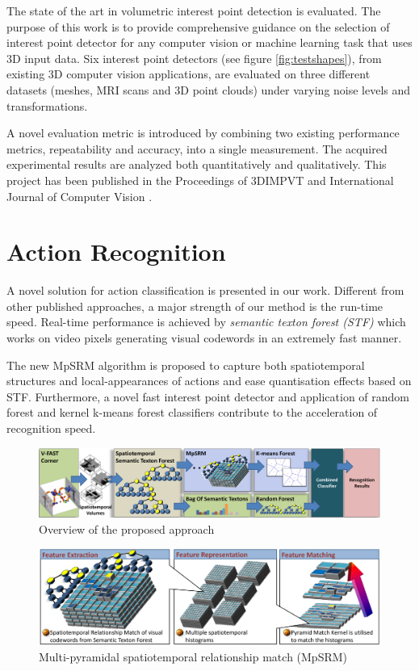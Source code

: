 \documentclass[10pt, a4paper]{article}
\begin{document}
The state of the art in volumetric interest point detection is evaluated. The purpose of this work is to provide comprehensive guidance on the selection of interest point detector for any computer vision or machine learning task that uses 3D input data. Six interest point detectors (see figure \ref{fig:testshapes}), from existing 3D computer vision applications, are evaluated on three different datasets (meshes, MRI scans and 3D point clouds) under varying noise levels and transformations. 

A novel evaluation metric is introduced by combining two existing performance metrics, repeatability and accuracy, into a single measurement. The acquired experimental results are analyzed both quantitatively and qualitatively. This project has been published in the Proceedings of 3DIMPVT \cite{Yu2011} and International Journal of Computer Vision \cite{Yu2013b}. 

\section{Action Recognition}

A novel solution for action classification is presented in our work. Different from other published approaches, a major strength of our method is the run-time speed. Real-time performance is achieved by \emph{semantic texton forest (STF)} which works on video pixels generating visual codewords in an extremely fast manner. 

The new MpSRM algorithm is proposed to capture both spatiotemporal structures and local-appearances of actions and ease quantisation effects based on STF. Furthermore, a novel fast interest point detector and application of random forest and kernel k-means forest classifiers contribute to the acceleration of recognition speed.

\begin{figure}[ht]
\includegraphics[width=1.0\linewidth]{fig/act/fig1_new.pdf}%
\caption{Overview of the proposed approach}
\label{fig/act/flow}
\end{figure}

\begin{figure}[ht]
\includegraphics[width=1\linewidth]{fig/act/fig4.pdf}%
\caption{Multi-pyramidal spatiotemporal relationship match (MpSRM)}
\label{fig/act/mpsrm}
\end{figure}
\end{document}
